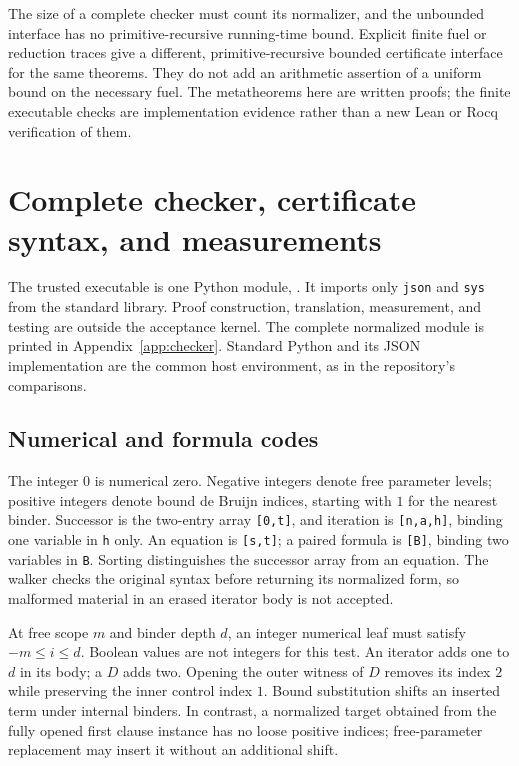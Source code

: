 \documentclass[11pt,a4paper]{article}
\theoremstyle{definition}\newtheorem{definition}[theorem]{Definition}
\theoremstyle{remark}\newtheorem{remark}[theorem]{Remark}
\begin{document}
The size of a complete checker must count its normalizer, and the
unbounded interface has no primitive-recursive running-time bound.
Explicit finite fuel or reduction traces give a different,
primitive-recursive bounded certificate interface for the same
theorems. They do not add an arithmetic assertion of a uniform bound
on the necessary fuel. The metatheorems here are written proofs; the
finite executable checks are implementation evidence rather than a
new Lean or Rocq verification of them.


\section{Complete checker, certificate syntax, and measurements}
\label{sec:implementation}

The trusted executable is one Python module, .
It imports only \texttt{json} and \texttt{sys} from the standard library.
Proof construction, translation, measurement, and testing are outside the
acceptance kernel. The complete normalized module is printed in
Appendix~\ref{app:checker}. Standard Python and its JSON implementation
are the common host environment, as in the repository's comparisons.

\subsection{Numerical and formula codes}

The integer $0$ is numerical zero. Negative integers denote free
parameter levels; positive integers denote bound de Bruijn indices,
starting with $1$ for the nearest binder. Successor is the two-entry
array \texttt{[0,t]}, and iteration is \texttt{[n,a,h]}, binding one
variable in \texttt{h} only. An equation is \texttt{[s,t]}; a paired
formula is \texttt{[B]}, binding two variables in \texttt{B}. Sorting
distinguishes the successor array from an equation. The walker checks
the original syntax before returning its normalized form, so malformed
material in an erased iterator body is not accepted.

At free scope $m$ and binder depth $d$, an integer numerical leaf must
satisfy $-m\le i\le d$. Boolean values are not integers for this test.
An iterator adds one to $d$ in its body; a $D$ adds two. Opening the
outer witness of $D$ removes its index $2$ while preserving the inner
control index $1$. Bound substitution shifts an inserted term under
internal binders. In contrast, a normalized target obtained from the
fully opened first clause instance has no loose positive indices;
free-parameter replacement may insert it without an additional shift.
\end{document}
